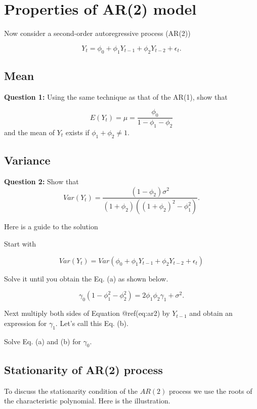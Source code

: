 \documentclass[
  11pt,
  a4paper,
]{report}
\begin{document}
\section{Properties of AR(2) model}\label{properties-of-ar2-model}

Now consider a second-order autoregressive process (AR(2))

\begin{equation}
Y_t=\phi_0+\phi_1Y_{t-1}+\phi_2Y_{t-2}+\epsilon_t.
\end{equation}

\subsection{Mean}\label{mean-1}

\textbf{Question 1:} Using the same technique as that of the AR(1), show
that

\[E(Y_t) = \mu = \frac{\phi_0}{1-\phi_1 - \phi_2}\] and the mean of
\(Y_t\) exists if \(\phi_1 + \phi_2 \neq 1\).

\subsection{Variance}\label{variance}

\textbf{Question 2:} Show that
\[Var(Y_t) = \frac{(1-\phi_2)\sigma^2}{(1+\phi_2)((1+\phi_2)^2-\phi_1^2)}.\]

Here is a guide to the solution

Start with

\[Var(Y_t)=Var(\phi_0+\phi_1Y_{t-1}+\phi_2Y_{t-2}+\epsilon_t)\]

Solve it until you obtain the Eq. (a) as shown below.

\begin{equation}
\gamma_0 (1-\phi_1^2 - \phi_2^2) = 2\phi_1\phi_2\gamma_1+\sigma^2.
\end{equation}

Next multiply both sides of Equation @ref(eq:ar2) by \(Y_{t-1}\) and
obtain an expression for \(\gamma_1\). Let's call this Eq. (b).

Solve Eq. (a) and (b) for \(\gamma_0.\)

\subsection{Stationarity of AR(2)
process}\label{stationarity-of-ar2-process}

To discuss the stationarity condition of the \(AR(2)\) process we use
the roots of the characteristic polynomial. Here is the illustration.
\end{document}
